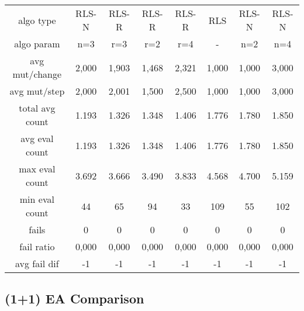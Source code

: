 \begin{tabular}[h]{cccccccc}
algo type&            RLS-N&     RLS-R&     RLS-R&     RLS-R&       RLS&     RLS-N&     RLS-N\\
algo param&             n=3&       r=3&       r=2&       r=4&         -&       n=2&       n=4\\
avg mut/change&       2,000&     1,903&     1,468&     2,321&     1,000&     1,000&     3,000\\
avg mut/step&         2,000&     2,001&     1,500&     2,500&     1,000&     1,000&     3,000\\
\hline
total avg count&      1.193&     1.326&     1.348&     1.406&     1.776&     1.780&     1.850\\
avg eval count&       1.193&     1.326&     1.348&     1.406&     1.776&     1.780&     1.850\\
max eval count&       3.692&     3.666&     3.490&     3.833&     4.568&     4.700&     5.159\\
min eval count&          44&        65&        94&        33&       109&        55&       102\\
\hline
fails&                    0&         0&         0&         0&         0&         0&         0\\
fail ratio&           0,000&     0,000&     0,000&     0,000&     0,000&     0,000&     0,000\\
avg fail dif&            -1&        -1&        -1&        -1&        -1&        -1&        -1\\
\end{tabular}


\subsection{(1+1) EA Comparison}


